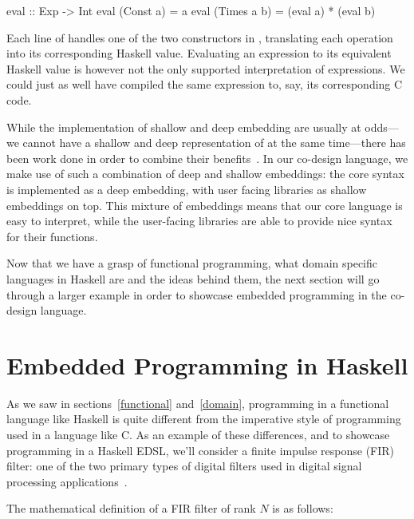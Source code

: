 \documentclass[../paper.tex]{subfiles}
\begin{document}
\begin{code}
eval :: Exp -> Int
eval (Const a)   = a
eval (Times a b) = (eval a) * (eval b)
\end{code}

\noindent Each line of  handles one of the two constructors in , translating each operation into its corresponding Haskell value. Evaluating an expression to its equivalent Haskell value is however not the only supported interpretation of expressions. We could just as well have compiled the same expression to, say, its corresponding C code.

While the implementation of shallow and deep embedding are usually at odds---we cannot have a shallow and deep representation of  at the same time---there has been work done in order to combine their benefits~\cite{svenningsson2012}. In our co-design language, we make use of such a combination of deep and shallow embeddings: the core syntax is implemented as a deep embedding, with user facing libraries as shallow embeddings on top. This mixture of embeddings means that our core language is easy to interpret, while the user-facing libraries are able to provide nice syntax for their functions.

Now that we have a grasp of functional programming, what domain specific languages in Haskell are and the ideas behind them, the next section will go through a larger example in order to showcase embedded programming in the co-design language.

\section{Embedded Programming in Haskell}
\label{embedded}

As we saw in sections~\ref{functional} and~\ref{domain}, programming in a functional language like Haskell is quite different from the imperative style of programming used in a language like C. As an example of these differences, and to showcase programming in a Haskell EDSL, we'll consider a finite impulse response (FIR) filter: one of the two primary types of digital filters used in digital signal processing applications~\cite{oppenheim1989}.


The mathematical definition of a FIR filter of rank $N$ is as follows:
\end{document}
